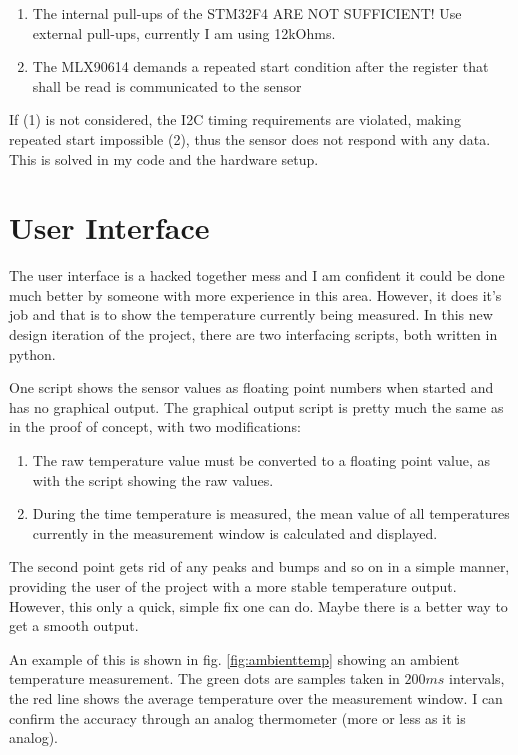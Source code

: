\documentclass{article}[12pt]
\begin{document}
\begin{enumerate}
\item The internal pull-ups of the STM32F4 ARE NOT SUFFICIENT! Use external pull-ups, currently I am using 12kOhms. 
\item The MLX90614 demands a repeated start condition after the register that shall be read is communicated to the sensor
\end{enumerate}

If (1) is not considered, the I2C timing requirements are violated, making repeated start impossible (2), thus the sensor does not respond with any data. This is solved in my code and the hardware setup. 

\section{User Interface}

The user interface is a hacked together mess and I am confident it could be done much better by someone with more experience in this area. However, it does it's job and that is to show the temperature currently being measured. In this new design iteration of the project, there are two interfacing scripts, both written in python. 

One script shows the sensor values as floating point numbers when started and has no graphical output. The graphical output script is pretty much the same as in the proof of concept, with two modifications: 

\begin{enumerate}
	\item The raw temperature value must be converted to a floating point value, as with the script showing the raw values.
	\item During the time temperature is measured, the mean value of all temperatures currently in the measurement window is calculated and displayed.
\end{enumerate}

The second point gets rid of any peaks and bumps and so on in a simple manner, providing the user of the project with a more stable temperature output. However, this only a quick, simple fix one can do. Maybe there is a better way to get a smooth output. 

An example of this is shown in fig. \ref{fig:ambienttemp} showing an ambient temperature measurement. The green dots are samples taken in $200ms$ intervals, the red line shows the average temperature over the measurement window. I can confirm the accuracy through an analog thermometer (more or less as it is analog).
\end{document}

